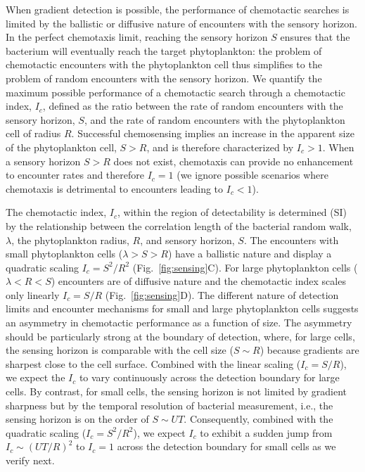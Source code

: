 \documentclass[9pt,twocolumn,twoside]{pnas-new}
\begin{document}
When gradient detection is possible, the performance of chemotactic searches is limited by the ballistic or diffusive nature of encounters with the sensory horizon.
In the perfect chemotaxis limit, reaching the sensory horizon $S$ ensures that the bacterium will eventually reach the target phytoplankton: the problem of chemotactic encounters with the phytoplankton cell thus simplifies to the problem of random encounters with the sensory horizon.
We quantify the maximum possible performance of a chemotactic search through a chemotactic index, $I_c$, defined as the ratio between the rate of random encounters with the sensory horizon, $S$, and the rate of random encounters with the phytoplankton cell of radius $R$.
Successful chemosensing implies an increase in the apparent size of the phytoplankton cell, $S>R$, and is therefore characterized by $I_c>1$.
When a sensory horizon $S>R$ does not exist, chemotaxis can provide no enhancement to encounter rates and therefore $I_c=1$ (we ignore possible scenarios where chemotaxis is detrimental to encounters leading to $I_c<1$).

The chemotactic index, $I_c$, within the region of detectability is determined (SI) by the relationship between the correlation length of the bacterial random walk, $\lambda$, the phytoplankton radius, $R$, and sensory horizon, $S$. The encounters with small phytoplankton cells ($\lambda>S>R$) have a ballistic nature and display a quadratic scaling $I_c = S^2/R^2$ (Fig.~\ref{fig:sensing}C). For large phytoplankton cells ($\lambda < R < S$) encounters are of diffusive nature and the chemotactic index scales only linearly $I_c = S/R$ (Fig.~\ref{fig:sensing}D).
The different nature of detection limits and encounter mechanisms for small and large phytoplankton cells suggests an asymmetry in chemotactic performance as a function of size. The asymmetry should be particularly strong at the boundary of detection, where, for large cells, the sensing horizon is comparable with the cell size ($S\sim R$) because gradients are sharpest close to the cell surface. Combined with the linear scaling ($I_c=S/R$), we expect the $I_c$ to vary continuously across the detection boundary for large cells. By contrast, for small cells, the sensing horizon is not limited by gradient sharpness but by the temporal resolution of bacterial measurement, i.e., the sensing horizon is on the order of $S\sim UT$. Consequently, combined with the quadratic scaling ($I_c = S^2/R^2$), we expect $I_c$ to exhibit a sudden jump from $I_c \sim (UT/R)^2$ to $I_c = 1$ across the detection boundary for small cells as we verify next. 
\end{document}
